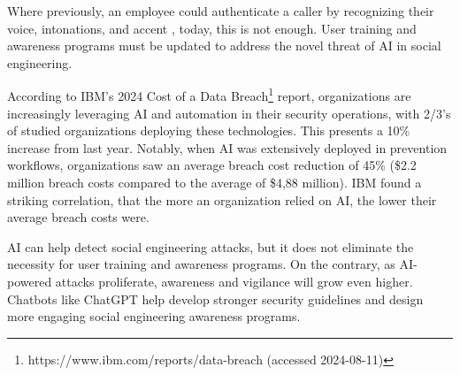 
Where previously, an employee could authenticate a caller by recognizing their voice, intonations, and accent \citep{mitnick_The_Art_of_Deception_2003}, today, this is not enough. User training and awareness programs must be updated to address the novel threat of AI in social engineering.


According to IBM's 2024 Cost of a Data Breach\footnote{https://www.ibm.com/reports/data-breach (accessed 2024-08-11)} report, organizations are increasingly leveraging AI and automation in their security operations, with 2/3's of studied organizations deploying these technologies. This presents a 10\% increase from last year. Notably, when AI was extensively deployed in prevention workflows, organizations saw an average breach cost reduction of 45\% (\$2.2 million breach costs compared to the average of \$4,88 million). IBM found a striking correlation, that the more an organization relied on AI, the lower their average breach costs were.

AI can help detect social engineering attacks, but it does not eliminate the necessity for user training and awareness programs. On the contrary, as AI-powered attacks proliferate, awareness and vigilance will grow even higher. Chatbots like ChatGPT help develop stronger security guidelines and design more engaging social engineering awareness programs.

